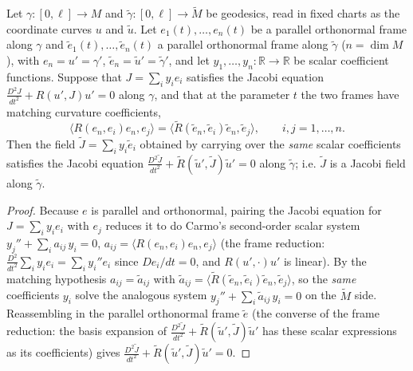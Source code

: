 \begin{lemma}
  \label{lem:dc-ch8-2-1-jacobi-transfer}
  \leanok
  Let $\gamma:[0,\ell]\to M$ and $\tilde\gamma:[0,\ell]\to\tilde M$ be geodesics, read
  in fixed charts as the coordinate curves $u$ and $\tilde u$. Let $e_1(t),\dots,e_n(t)$
  be a parallel orthonormal frame along $\gamma$ and $\tilde e_1(t),\dots,\tilde e_n(t)$
  a parallel orthonormal frame along $\tilde\gamma$ ($n=\dim M$), with $e_n=u'=\gamma'$,
  $\tilde e_n=\tilde u'=\tilde\gamma'$, and let $y_1,\dots,y_n:\mathbb R\to\mathbb R$ be
  scalar coefficient functions. Suppose that $J=\sum_i y_i e_i$ satisfies the Jacobi
  equation $\tfrac{D^2 J}{dt^2}+R(u',J)u'=0$ along $\gamma$, and that at the parameter
  $t$ the two frames have matching curvature coefficients,
  $$
  \langle R(e_n,e_i)e_n,e_j\rangle=\langle\tilde R(\tilde e_n,\tilde e_i)\tilde e_n,\tilde e_j\rangle,
  \qquad i,j=1,\dots,n.
  $$
  Then the field $\tilde J=\sum_i y_i\tilde e_i$ obtained by carrying over the \emph{same}
  scalar coefficients satisfies the Jacobi equation
  $\tfrac{D^2\tilde J}{dt^2}+\tilde R(\tilde u',\tilde J)\tilde u'=0$ along $\tilde\gamma$;
  i.e. $\tilde J$ is a Jacobi field along $\tilde\gamma$.
\end{lemma}
\begin{proof}
  \leanok
  Because $e$ is parallel and orthonormal, pairing the Jacobi equation for
  $J=\sum_i y_i e_i$ with $e_j$ reduces it to do Carmo's second-order scalar system
  $y_j''+\sum_i a_{ij}\,y_i=0$, $a_{ij}=\langle R(e_n,e_i)e_n,e_j\rangle$ (the frame
  reduction: $\tfrac{D^2}{dt^2}\sum_i y_i e_i=\sum_i y_i''e_i$ since $De_i/dt=0$, and
  $R(u',\cdot)u'$ is linear). By the matching hypothesis $a_{ij}=\tilde a_{ij}$ with
  $\tilde a_{ij}=\langle\tilde R(\tilde e_n,\tilde e_i)\tilde e_n,\tilde e_j\rangle$, so
  the \emph{same} coefficients $y_i$ solve the analogous system
  $y_j''+\sum_i\tilde a_{ij}\,y_i=0$ on the $\tilde M$ side. Reassembling in the parallel
  orthonormal frame $\tilde e$ (the converse of the frame reduction: the basis expansion
  of $\tfrac{D^2\tilde J}{dt^2}+\tilde R(\tilde u',\tilde J)\tilde u'$ has these scalar
  expressions as its coefficients) gives $\tfrac{D^2\tilde J}{dt^2}+\tilde R(\tilde u',\tilde J)\tilde u'=0$.
\end{proof}

